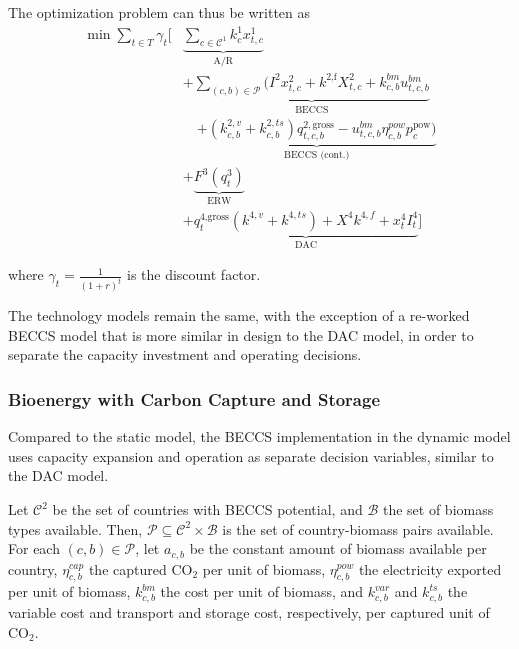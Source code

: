 The optimization problem can thus be written as
\begin{equation}
\begin{aligned}
\min \sum_{t\in T}\gamma_t \Big[ 
& \underbrace{\sum_{c\in \mathcal{C}^1} k^1_c x_{t,c}^1}_{\text{A/R}} \\[4pt]
& + \underbrace{\sum_{(c,b) \in \mathcal{P}} \Big(
    I^2 x_{t,c}^2 
    + k^{\text{2,f}} X_{t,c}^2 
    + k_{c,b}^{bm} u_{t,c,b}^{bm} }_{\text{BECCS}} \\
& \quad \underbrace{
    + \left( k_{c,b}^{2, v} + k_{c,b}^{2, ts} \right) q_{t,c,b}^{2,\text{gross}} 
    - u_{t,c,b}^{bm} \eta_{c,b}^{pow} p_c^\text{pow}
\Big)}_{\text{BECCS (cont.)}} \\[4pt]
& + \underbrace{F^3(q_t^3)}_{\text{ERW}} \\[4pt]
& + \underbrace{
    q_t^\text{4,gross} (k^{4,v}  + k^{4,ts})
    + X^4 k^{4,f} 
    + x_t^4 I_t^4
}_{\text{DAC}}
\Big]
\end{aligned}
\end{equation}

where $\gamma_t = \frac{1}{(1+r)^t}$ is the discount factor.\vspace{2mm}

The technology models remain the same, with the exception of a re-worked BECCS model that is more similar in design to the DAC model, in order to separate the capacity investment and operating decisions.

\subsubsection{Bioenergy with Carbon Capture and Storage}
Compared to the static model, the BECCS implementation in the dynamic model uses capacity expansion and operation as separate decision variables, similar to the DAC model.\vspace{2mm}

Let $\mathcal{C}^2$ be the set of countries with BECCS potential, and $\mathcal{B}$ the set of biomass types available. Then, $\mathcal{P}\subseteq\mathcal{C}^2\times\mathcal{B}$ is the set of country-biomass pairs available. For each $(c,b) \in \mathcal{P}$, let $a_{c,b}$ be the constant amount of biomass available per country, $\eta_{c,b}^{cap}$ the captured CO$_2$ per unit of biomass, $\eta_{c,b}^{pow}$ the electricity exported per unit of biomass, $k_{c,b}^{bm}$ the cost per unit of biomass, and $k_{c,b}^{var}$ and $k_{c,b}^{ts}$ the variable cost and transport and storage cost, respectively, per captured unit of CO$_2$.\vspace{2mm}

